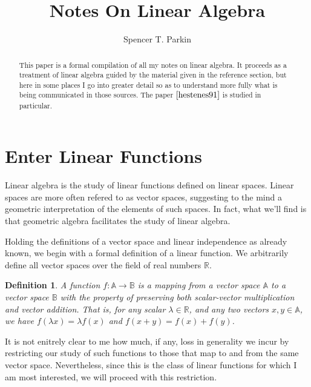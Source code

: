 \documentclass[12pt]{article}
\title{Notes On Linear Algebra}
\author{Spencer T. Parkin}
\newcommand{\R}{\mathbb{R}}
\newcommand{\A}{\mathbb{A}}
\newcommand{\B}{\mathbb{B}}
\newtheorem{definition}{Definition}[section]
\begin{document}
\maketitle

\begin{abstract}
This paper is a formal compilation of all my notes on linear algebra.
It proceeds as a treatment of linear algebra guided by the material
given in the reference section, but here in some places I go into greater detail so as
to understand more fully what is being communicated in those sources.
The paper $\cite{hestenes91}$ is studied in particular.
\nocite{macdonald12}
\end{abstract}

\section{Enter Linear Functions}

Linear algebra is the study of linear functions defined on linear spaces.
Linear spaces are more often refered to as vector spaces, suggesting
to the mind a geometric interpretation of the elements of such spaces.
In fact, what we'll find is that geometric algebra facilitates the study
of linear algebra.

Holding the definitions of a vector space and linear independence as
already known, we begin with a formal definition of a linear function.
We arbitrarily define all vector spaces over the field of real numbers $\R$.
\begin{definition}
A function $f:\A\to\B$ is a mapping from a vector space $\A$ to
a vector space $\B$ with the property of preserving both scalar-vector
multiplication and vector addition.  That is, for any scalar $\lambda\in\R$,
and any two vectors $x,y\in\A$, we have $f(\lambda x)=\lambda f(x)$ and
$f(x+y)=f(x)+f(y)$.
\end{definition}
It is not enitrely clear to me how much, if any, loss in generality we incur
by restricting our study of such functions to those that map to and from
the same vector space.  Nevertheless, since this is the class of linear
functions for which I am most interested, we will proceed with this restriction.
\end{document}
